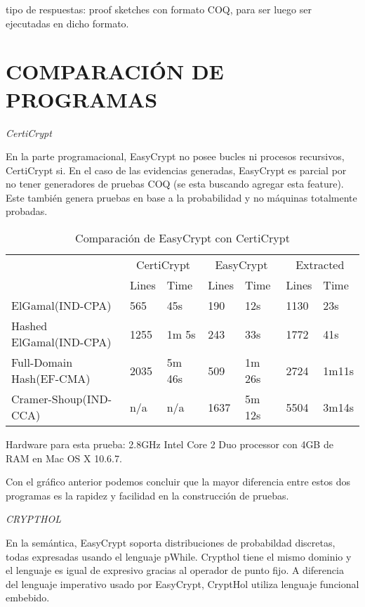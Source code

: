 \documentclass[runningheads,a4paper]{llncs}
\begin{document}
tipo de respuestas: proof sketches con formato COQ, para ser luego ser ejecutadas en dicho formato.\cite{article6}


\section{COMPARACIÓN DE PROGRAMAS}
\centerline{\emph{CertiCrypt}}

En la parte programacional, EasyCrypt no posee bucles ni procesos recursivos, CertiCrypt si. En el caso de las evidencias generadas, EasyCrypt es parcial por no tener generadores de pruebas COQ (se esta buscando agregar esta feature). Este también genera pruebas en base a la probabilidad y no máquinas totalmente probadas.

\begin{table}
  \caption{Comparación de EasyCrypt con CertiCrypt}
  \label{tab:simple1}
  \centering
  \begin{tabular}{ |p{3.5cm}|p{1.5cm}|p{1.5cm}|p{1.5cm}|p{1.5cm}|p{1.5cm}|p{1.5cm}|  }
 \hline
 & \multicolumn{2}{|c|}{CertiCrypt} & \multicolumn{2}{|c|}{EasyCrypt} & \multicolumn{2}{|c|}{Extracted} \\\cline{2-7}

 &Lines&Time&Lines&Time&Lines&Time\\\cline{2-7}
 \hline
 ElGamal(IND-CPA) & 565 & 45s & 190 & 12s & 1130 & 23s\\
 Hashed ElGamal(IND-CPA) & 1255  & 1m 5s & 243  & 33s & 1772 & 41s\\
 Full-Domain Hash(EF-CMA) & 2035 & 5m 46s&  509 & 1m 26s & 2724 & 1m11s\\
 Cramer-Shoup(IND-CCA) & n/a & n/a & 1637 & 5m 12s & 5504 & 3m14s\\
 \hline
\end{tabular}
\end{table}

Hardware para esta prueba: 2.8GHz Intel Core 2 Duo processor con 4GB de RAM en Mac OS X 10.6.7.\cite{article5}

Con el gráfico anterior podemos concluir que la mayor diferencia entre estos dos programas es la rapidez y facilidad en la construcción de pruebas.

\centerline{\emph{CRYPTHOL}}

En la semántica, EasyCrypt soporta distribuciones de probabildad discretas, todas expresadas usando el lenguaje pWhile. Crypthol tiene el mismo dominio y el lenguaje es igual de expresivo gracias al operador de punto fijo. A diferencia del lenguaje imperativo usado por EasyCrypt, CryptHol utiliza lenguaje funcional embebido.
\end{document}
